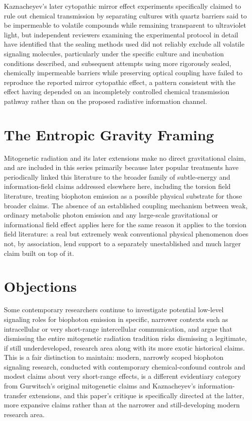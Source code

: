 \documentclass[11pt]{article}
\begin{document}
Kaznacheyev's later cytopathic mirror effect experiments specifically claimed to rule out chemical transmission by separating cultures with quartz barriers said to be impermeable to volatile compounds while remaining transparent to ultraviolet light, but independent reviewers examining the experimental protocol in detail have identified that the sealing methods used did not reliably exclude all volatile signaling molecules, particularly under the specific culture and incubation conditions described, and subsequent attempts using more rigorously sealed, chemically impermeable barriers while preserving optical coupling have failed to reproduce the reported mirror cytopathic effect, a pattern consistent with the effect having depended on an incompletely controlled chemical transmission pathway rather than on the proposed radiative information channel.

\section{The Entropic Gravity Framing}

Mitogenetic radiation and its later extensions make no direct gravitational claim, and are included in this series primarily because later popular treatments have periodically linked this literature to the broader family of subtle-energy and information-field claims addressed elsewhere here, including the torsion field literature, treating biophoton emission as a possible physical substrate for those broader claims. The absence of an established coupling mechanism between weak, ordinary metabolic photon emission and any large-scale gravitational or informational field effect applies here for the same reason it applies to the torsion field literature: a real but extremely weak conventional physical phenomenon does not, by association, lend support to a separately unestablished and much larger claim built on top of it.

\section{Objections}

Some contemporary researchers continue to investigate potential low-level signaling roles for biophoton emission in specific, narrower contexts such as intracellular or very short-range intercellular communication, and argue that dismissing the entire mitogenetic radiation tradition risks dismissing a legitimate, if still underdeveloped, research area along with its more exotic historical claims. This is a fair distinction to maintain: modern, narrowly scoped biophoton signaling research, conducted with contemporary chemical-confound controls and modest claims about very short-range effects, is a different evidentiary category from Gurwitsch's original mitogenetic claims and Kaznacheyev's information-transfer extensions, and this paper's critique is specifically directed at the latter, more expansive claims rather than at the narrower and still-developing modern research area.
\end{document}
